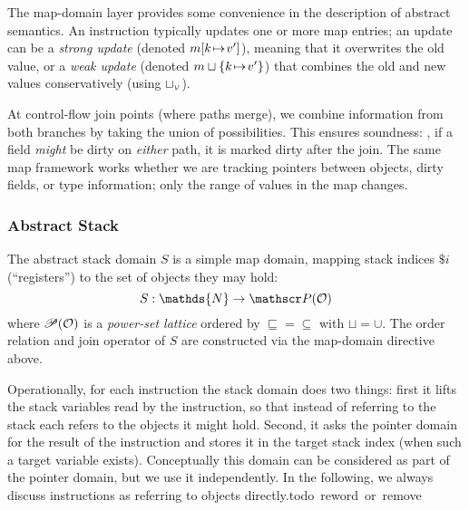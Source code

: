 The map-domain layer provides some convenience in the description of abstract semantics.
An instruction typically updates one or more map entries;
an update can be a \emph{strong update} (denoted $m[k{\hspace{1pt}\mapsto\hspace{1pt}} v']$), meaning that it overwrites the old value,
or a \emph{weak update} (denoted $m\sqcup \{k{\hspace{1pt}\mapsto\hspace{1pt}} v'\}$) that
combines the old and new values conservatively (using $\sqcup_{\scriptscriptstyle\mathcal{V}}$).

At control-flow join points (where paths merge), we combine information from both branches by taking the union of possibilities. This ensures soundness: \eg, if a field \emph{might} be dirty on \emph{either} path, it is marked dirty after the join. The same map framework works whether we are tracking pointers between objects, dirty fields, or type information; only the range of values in the map changes.

\subsubsection*{Abstract Stack} The abstract stack domain $S$ is a simple map domain, mapping stack indices $\$i$ (``registers'') to the set of objects they may hold:
\[S : \mathds{N} \to \powerset(\mathcal{O})\]
%
where $\mathscr{P}(\mathcal{O})$ is a \emph{power-set lattice} ordered by ${\sqsubseteq}={\subseteq}$ with ${\sqcup}={\cup}$.
The order relation and join operator of $S$ are constructed via the map-domain
directive above.

Operationally, for each instruction the stack domain does two things: first it lifts the stack variables read by the instruction, so that instead of referring to the stack each refers to the objects it might hold. Second, it asks the pointer domain for the result of the instruction and stores it in the target stack index (when such a target variable exists). Conceptually this domain can be considered as part of the pointer domain, but we use it independently. In the following, we always discuss instructions as referring to objects directly.\si{todo reword or remove}

